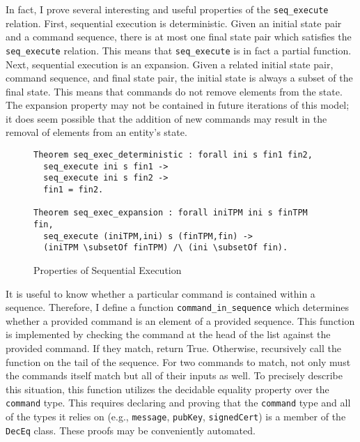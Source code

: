 In fact, I prove several interesting and useful properties of the \verb|seq_execute| relation. First, sequential execution is deterministic. Given an initial state pair and a command sequence, there is at most one final state pair which satisfies the \verb|seq_execute| relation. This means that \verb|seq_execute| is in fact a partial function. Next, sequential execution is an expansion. Given a related initial state pair, command sequence, and final state pair, the initial state is always a subset of the final state. This means that commands do not remove elements from the state. The expansion property may not be contained in future iterations of this model; it does seem possible that the addition of new commands may result in the removal of elements from an entity's state.
\begin{figure}[h]
\begin{lstlisting}[language=Coq]
Theorem seq_exec_deterministic : forall ini s fin1 fin2,
  seq_execute ini s fin1 ->
  seq_execute ini s fin2 ->
  fin1 = fin2.

Theorem seq_exec_expansion : forall iniTPM ini s finTPM fin,
  seq_execute (iniTPM,ini) s (finTPM,fin) ->
  (iniTPM \subsetOf finTPM) /\ (ini \subsetOf fin).
\end{lstlisting}
\caption{Properties of Sequential Execution}
\end{figure}




It is useful to know whether a particular command is contained within a sequence. Therefore, I define a function \verb|command_in_sequence| which determines whether a provided command is an element of a provided sequence. This function is implemented by checking the command at the head of the list against the provided command. If they match, return True. Otherwise, recursively call the function on the tail of the sequence.
For two commands to match, not only must the commands itself match but all of their inputs as well. To precisely describe this situation, this function utilizes the decidable equality property over the \verb|command| type. This requires declaring and proving that the \verb|command| type and all of the types it relies on (e.g., \verb|message|, \verb|pubKey|, \verb|signedCert|) is a member of the \verb|DecEq| class. These proofs may be conveniently automated.